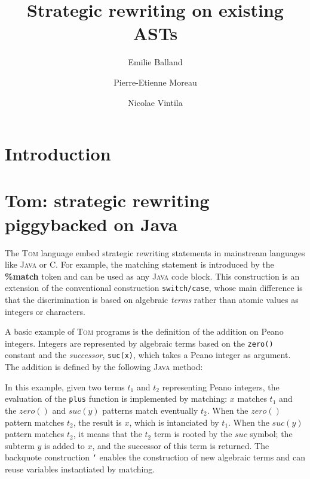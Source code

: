 \documentclass[runningheads]{llncs}
\title{Strategic rewriting on existing ASTs}
\author{Emilie Balland \and Pierre-Etienne Moreau \and Nicolae Vintila}
\institute{INRIA \& LORIA,\\
  BP 101, 54602 Villers-l{\`e}s-Nancy Cedex France\\
\email{\{Emilie.Balland,Pierre-Etienne.Moreau\}@loria.fr,nick@domainspecificconsulting.com}}
\newcommand{\tom}{\textsc{Tom}}
\newcommand{\java}{\textsc{Java}}
\newcommand{\C}{\textsf{C}}
\newcommand{\lex}[1]{{\textrm{\textbf{#1}}}}
\begin{document}
\maketitle

\begin{abstract}

\end{abstract}

\section{Introduction}

\section{Tom: strategic rewriting piggybacked on Java}
	
The {\tom} language embed strategic rewriting statements in  mainstream
languages like {\java} or {\C}.  For example, the matching statement is
introduced by the \lex{\%match} token and can be used as any {\java} code
block.  This construction is an extension of the conventional construction
\texttt{switch/case}, whose main difference is that the discrimination is
based on algebraic \emph{terms} rather than atomic values as integers or
characters.

A basic example of {\tom} programs is the definition of the addition on Peano
integers. Integers are represented by algebraic terms based on the
\texttt{zero()} constant and the \emph{successor}, \texttt{suc(x)},  which
takes a Peano integer as argument.  The addition is defined by the following
{\java} method:

\medskip
{}

In this example, given two terms  $t_1$ and $t_2$ representing Peano integers,
the evaluation of the \texttt{plus} function is implemented by matching: $x$
matches $t_1$ and the $zero()$ and $suc(y)$ patterns match eventually $t_2$.
When the $zero()$ pattern matches $t_2$, the result is $x$, which
is intanciated by $t_1$. When the $suc(y)$ pattern matches $t_2$, it means
that the $t_2$ term is rooted by the $suc$ symbol; the subterm $y$ is added
to $x$, and the successor of this term is returned. The backquote construction
\texttt{`} enables the construction of new algebraic terms and can reuse
variables instantiated by matching.
\end{document}
